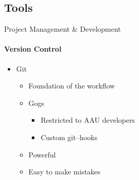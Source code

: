 \subsection{Tools}
\begin{frame}{Project Management \& Development}\framesubtitle{Version Control}
    \begin{itemize}
        \item Git
        \begin{itemize}
            \item Foundation of the workflow
            \item Gogs
            \begin{itemize}
                \item Restricted to AAU developers
                \item Custom git--hooks
            \end{itemize}
            \item Powerful
            \item Easy to make mistakes
        \end{itemize}
    \end{itemize}
\end{frame}

